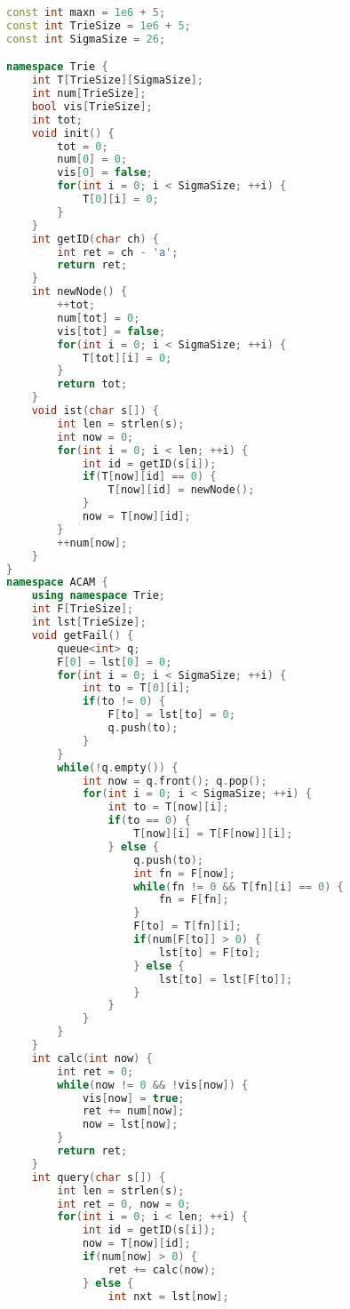 \begin{lstlisting}[language=C++]
const int maxn = 1e6 + 5;
const int TrieSize = 1e6 + 5;
const int SigmaSize = 26;

namespace Trie {
    int T[TrieSize][SigmaSize];
    int num[TrieSize];
    bool vis[TrieSize];
    int tot;
    void init() {
        tot = 0;
        num[0] = 0;
        vis[0] = false;
        for(int i = 0; i < SigmaSize; ++i) {
            T[0][i] = 0;
        }
    }
    int getID(char ch) {
        int ret = ch - 'a';
        return ret;
    }
    int newNode() {
        ++tot;
        num[tot] = 0;
        vis[tot] = false;
        for(int i = 0; i < SigmaSize; ++i) {
            T[tot][i] = 0;
        }
        return tot;
    }
    void ist(char s[]) {
        int len = strlen(s);
        int now = 0;
        for(int i = 0; i < len; ++i) {
            int id = getID(s[i]);
            if(T[now][id] == 0) {
                T[now][id] = newNode();
            }
            now = T[now][id];
        }
        ++num[now];
    }
}
namespace ACAM {
    using namespace Trie;
    int F[TrieSize];
    int lst[TrieSize];
    void getFail() {
        queue<int> q;
        F[0] = lst[0] = 0;
        for(int i = 0; i < SigmaSize; ++i) {
            int to = T[0][i];
            if(to != 0) {
                F[to] = lst[to] = 0;
                q.push(to);
            }
        }
        while(!q.empty()) {
            int now = q.front(); q.pop();
            for(int i = 0; i < SigmaSize; ++i) {
                int to = T[now][i];
                if(to == 0) {
                    T[now][i] = T[F[now]][i];
                } else {
                    q.push(to);
                    int fn = F[now];
                    while(fn != 0 && T[fn][i] == 0) {
                        fn = F[fn];
                    }
                    F[to] = T[fn][i];
                    if(num[F[to]] > 0) {
                        lst[to] = F[to];
                    } else {
                        lst[to] = lst[F[to]];
                    }
                }
            }
        }
    }
    int calc(int now) {
        int ret = 0;
        while(now != 0 && !vis[now]) {
            vis[now] = true;
            ret += num[now];
            now = lst[now];
        }
        return ret;
    }
    int query(char s[]) {
        int len = strlen(s);
        int ret = 0, now = 0;
        for(int i = 0; i < len; ++i) {
            int id = getID(s[i]);
            now = T[now][id];
            if(num[now] > 0) {
                ret += calc(now);
            } else {
                int nxt = lst[now];

\end{lstlisting}
